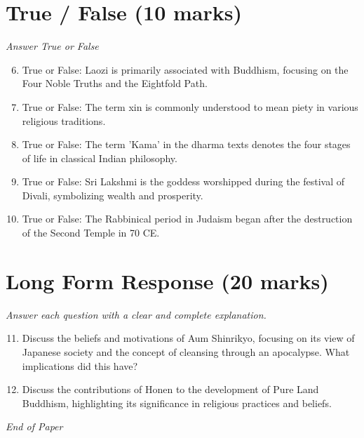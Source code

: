 \documentclass[12pt]{article}
\begin{document}
\section*{True / False (10 marks)}
\textit{Answer True or False}
\begin{enumerate}[label=\arabic*.]
\setcounter{enumi}{5}
\item True or False: Laozi is primarily associated with Buddhism, focusing on the Four Noble Truths and the Eightfold Path.
\item True or False: The term xin is commonly understood to mean piety in various religious traditions.
\item True or False: The term 'Kama' in the dharma texts denotes the four stages of life in classical Indian philosophy.
\item True or False: Sri Lakshmi is the goddess worshipped during the festival of Divali, symbolizing wealth and prosperity.
\item True or False: The Rabbinical period in Judaism began after the destruction of the Second Temple in 70 CE.
\end{enumerate}

\section*{Long Form Response (20 marks)}
\textit{Answer each question with a clear and complete explanation.}
\begin{enumerate}[label=\arabic*.]
\setcounter{enumi}{10}
\item Discuss the beliefs and motivations of Aum Shinrikyo, focusing on its view of Japanese society and the concept of cleansing through an apocalypse. What implications did this have?
\item Discuss the contributions of Honen to the development of Pure Land Buddhism, highlighting its significance in religious practices and beliefs.
\end{enumerate}

\vfill
\noindent\textit{End of Paper}
\end{document}
